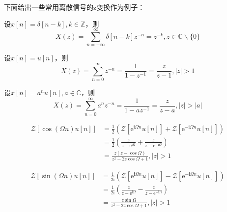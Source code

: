 \documentclass{ctexbook}
\begin{document}
下面给出一些常用离散信号的z变换作为例子：
\begin{example}[单位脉冲序列的z变换]
    设$x[n]=\delta[n-k],k\in\mathbb{Z}$，则
    \[X(z)=\sum_{n=-\infty}^{\infty}\delta[n-k]z^{-n}=z^{-k},z\in\mathbb{C}\backslash\{0\}\]
\end{example}
\begin{example}[单位阶跃序列的z变换]
    设$x[n]=u[n]$，则
    \[X(z)=\sum_{n=0}^{\infty}z^{-n}=\frac{1}{1-z^{-1}}=\frac{z}{z-1},|z|>1\]
\end{example}
\begin{example}[指数序列的z变换]
    设$x[n]=a^n u[n],a\in\mathbb{C}$，则
    \[X(z)=\sum_{n=0}^{\infty}a^n z^{-n}=\frac{1}{1-a z^{-1}}=\frac{z}{z-a},|z|>|a|\]
\end{example}
\begin{example}[单边余弦序列的z变换]
    \begin{align*}
        \mathcal{Z} \left[\cos(\Omega n)u[n]\right]&=\frac{1}{2}\left(\mathcal{Z} \left[\mathrm{e}^{\mathrm{i}\Omega n}u[n]\right]+\mathcal{Z} \left[\mathrm{e}^{-\mathrm{i}\Omega n}u[n]\right]\right)\\
        &=\frac{1}{2}\left(\frac{z}{z-\mathrm{e}^{\mathrm{i}\Omega}}+\frac{z}{z-\mathrm{e}^{-\mathrm{i}\Omega}}\right)\\
        &=\frac{z(z-\cos\Omega)}{z^2-2z\cos\Omega+1},|z|>1
    \end{align*}
\end{example}
\begin{example}[单边正弦序列的z变换]
    \begin{align*}
        \mathcal{Z} \left[\sin(\Omega n)u[n]\right]&=\frac{1}{2\mathrm{i}}\left(\mathcal{Z} \left[\mathrm{e}^{\mathrm{i}\Omega n}u[n]\right]-\mathcal{Z} \left[\mathrm{e}^{-\mathrm{i}\Omega n}u[n]\right]\right)\\
        &=\frac{1}{2\mathrm{i}}\left(\frac{z}{z-\mathrm{e}^{\mathrm{i}\Omega}}-\frac{z}{z-\mathrm{e}^{-\mathrm{i}\Omega}}\right)\\
        &=\frac{z\sin\Omega}{z^2-2z\cos\Omega+1},|z|>1
    \end{align*}
\end{example}
\end{document}
